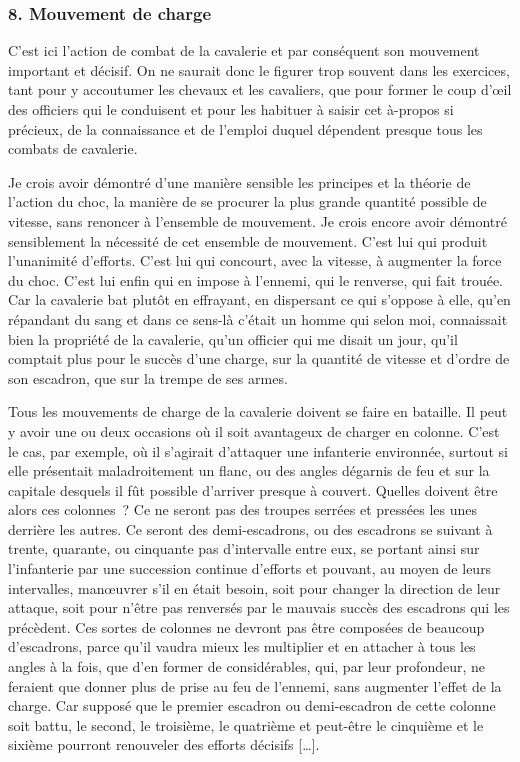 \documentclass[french,twoside]{book} %
\begin{document}
\subsubsection[{8. Mouvement de charge}]{8. Mouvement de charge}
\noindent C’est ici l’action de combat de la cavalerie et par conséquent son mouvement important et décisif. On ne saurait donc le figurer trop souvent dans les exercices, tant pour y accoutumer les chevaux et les cavaliers, que pour former le coup d’œil des officiers qui le conduisent et pour les habituer à saisir cet à-propos si précieux, de la connaissance et de l’emploi duquel dépendent presque tous les combats de cavalerie.\par
Je crois avoir démontré d’une manière sensible les principes et la théorie de l’action du choc, la manière de se procurer la plus grande quantité possible de vitesse, sans renoncer à l’ensemble de mouvement. Je crois encore avoir démontré sensiblement la nécessité de cet ensemble de mouvement. C’est lui qui produit l’unanimité d’efforts. C’est lui qui concourt, avec la vitesse, à augmenter la force du choc. C’est lui enfin qui en impose à l’ennemi, qui le renverse, qui fait trouée. Car la cavalerie bat plutôt en effrayant, en dispersant ce qui s’oppose à elle, qu’en répandant du sang et dans ce sens-là c’était un homme qui selon moi, connaissait bien la propriété de la cavalerie, qu’un officier qui me disait un jour, qu’il comptait plus pour le succès d’une charge, sur la quantité de vitesse et d’ordre de son escadron, que sur la trempe de ses armes.\par
Tous les mouvements de charge de la cavalerie doivent se faire en bataille. Il peut y avoir une ou deux occasions où il soit avantageux de charger en colonne. C’est le cas, par exemple, où il s’agirait d’attaquer une infanterie environnée, surtout si elle présentait maladroitement un flanc, ou des angles dégarnis de feu et sur la capitale desquels il fût possible d’arriver presque à couvert. Quelles doivent être alors ces colonnes ? Ce ne seront pas des troupes serrées et pressées les unes derrière les autres. Ce seront des demi-escadrons, ou des escadrons se suivant à trente, quarante, ou cinquante pas d’intervalle entre eux, se portant ainsi sur l’infanterie par une succession continue d’efforts et pouvant, au moyen de leurs intervalles, manœuvrer s’il en était besoin, soit pour changer la direction de leur attaque, soit pour n’être pas renversés par le mauvais succès des escadrons qui les précèdent. Ces sortes de colonnes ne devront pas être composées de beaucoup d’escadrons, parce qu’il vaudra mieux les multiplier et en attacher à tous les angles à la fois, que d’en former de considérables, qui, par leur profondeur, ne feraient que donner plus de prise au feu de l’ennemi, sans augmenter l’effet de la charge. Car supposé que le premier escadron ou demi-escadron de cette colonne soit battu, le second, le troisième, le quatrième et peut-être le cinquième et le sixième pourront renouveler des efforts décisifs […].\par
\end{document}
